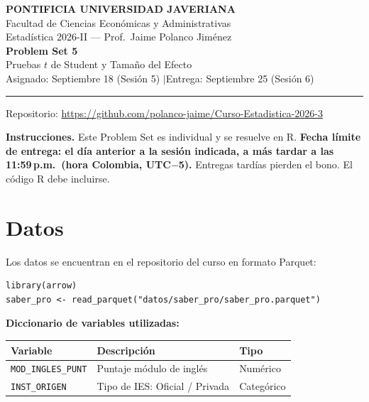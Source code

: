 \documentclass[11pt, a4paper]{article}
\begin{document}
\begin{center}
{\large\bfseries PONTIFICIA UNIVERSIDAD JAVERIANA}\\[3pt]
Facultad de Ciencias Econ\'omicas y Administrativas\\[2pt]
Estad\'istica 2026-II --- Prof.\ Jaime Polanco Jim\'enez\\[6pt]
{\LARGE\bfseries Problem Set 5}\\[3pt]
{\large Pruebas $t$ de Student y Tama\~no del Efecto}\\[6pt]
Asignado: Septiembre 18 (Sesi\'on 5) \quad$|$\quad Entrega: Septiembre 25 (Sesi\'on 6)
\end{center}

\vspace{6pt}
\rule{\linewidth}{0.5pt}
\vspace{2pt}
{\centering\small Repositorio: \url{https://github.com/polanco-jaime/Curso-Estadistica-2026-3}\par}
\vspace{6pt}

\textbf{Instrucciones.} Este Problem Set es individual y se resuelve en R.
\textbf{Fecha l\'imite de entrega: el d\'ia anterior a la sesi\'on indicada, a m\'as tardar a las 11:59\,p.m.\ (hora Colombia, UTC$-$5).} Entregas tard\'ias pierden el bono. El c\'odigo R debe incluirse.

\section*{Datos}

Los datos se encuentran en el repositorio del curso en formato Parquet:

\begin{lstlisting}
library(arrow)
saber_pro <- read_parquet("datos/saber_pro/saber_pro.parquet")
\end{lstlisting}

\textbf{Diccionario de variables utilizadas:}

\vspace{4pt}
\begin{tabular}{l l l}
\toprule
\textbf{Variable} & \textbf{Descripci\'on} & \textbf{Tipo} \\
\midrule
\texttt{MOD\_INGLES\_PUNT} & Puntaje m\'odulo de ingl\'es     & Num\'erico \\
\texttt{INST\_ORIGEN}      & Tipo de IES: Oficial / Privada  & Categ\'orico \\
\bottomrule
\end{tabular}
\end{document}
